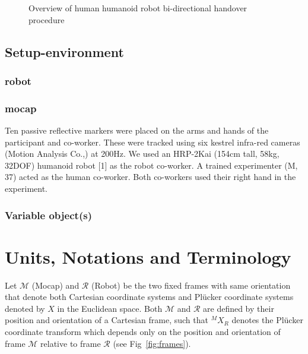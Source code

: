 \documentclass[a4paper, 12pt, oneside]{Thesis}  %
\begin{document}
\begin{figure}[htp]
	
	\caption{Overview of human humanoid robot bi-directional handover procedure}
\end{figure}

\subsection{Setup-environment}

\subsubsection{robot}
\subsubsection{mocap}
Ten passive reflective markers were placed on the arms and
hands of the participant and co-worker. These were tracked
using six kestrel infra-red cameras (Motion Analysis Co.,) at
200Hz.
We used an HRP-2Kai (154cm tall, 58kg, 32DOF)
humanoid robot [1] as the robot co-worker. A trained
experimenter (M, 37) acted as the human co-worker. Both
co-workers used their right hand in the experiment.

\subsubsection{Variable object(s)}


\clearpage

\section{Units, Notations and Terminology}
Let $\mathcal{M}$ (Mocap) and $\mathcal{R}$ (Robot) be the two fixed frames with same orientation that denote both Cartesian coordinate systems and Pl\"ucker coordinate systems denoted by $X$ in the Euclidean space. Both $\mathcal{M}$ and $\mathcal{R}$ are defined by their position and orientation of a Cartesian frame, such that ${}^MX_R$ denotes the Pl\"ucker coordinate transform which depends only on the position and orientation of frame $\mathcal{M}$ relative to frame $\mathcal{R}$ (see Fig~\ref{fig:frames}).
\end{document}
